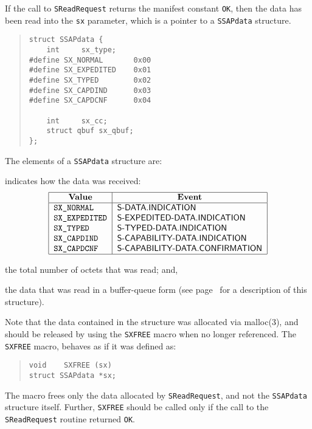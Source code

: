 If the call to \verb"SReadRequest" returns the manifest constant \verb"OK",
then the data has been read into the \verb"sx" parameter,
which is a pointer to a \verb"SSAPdata" structure.
\begin{quote}\small\begin{verbatim}
struct SSAPdata {
    int     sx_type;
#define SX_NORMAL       0x00
#define SX_EXPEDITED    0x01
#define SX_TYPED        0x02
#define SX_CAPDIND      0x03
#define SX_CAPDCNF      0x04

    int     sx_cc;
    struct qbuf sx_qbuf;
};
\end{verbatim}\end{quote}
The elements of a \verb"SSAPdata" structure are:
\begin{describe}
\item[\verb"sx\_type":] indicates how the data was received:
\[\begin{tabular}{|l|l|}
\hline
    \multicolumn{1}{|c|}{\bf Value}&
		\multicolumn{1}{c|}{\bf Event}\\
\hline
    \tt SX\_NORMAL&	\sf S-DATA.INDICATION\\
    \tt SX\_EXPEDITED&	\sf S-EXPEDITED-DATA.INDICATION\\
    \tt SX\_TYPED&	\sf S-TYPED-DATA.INDICATION\\
    \tt SX\_CAPDIND&	\sf S-CAPABILITY-DATA.INDICATION\\
    \tt SX\_CAPDCNF&	\sf S-CAPABILITY-DATA.CONFIRMATION\\
\hline
\end{tabular}\]

\item[\verb"sx\_cc":] the total number of octets that was read;
and,

\item[\verb"sx\_qbuf":] the data that was read in a buffer-queue form
(see page~\pageref{tsap:qbuf} for a description of this structure).
\end{describe}
Note that the data contained in the structure was allocated via \man malloc(3),
and should be released by using the \verb"SXFREE" macro when no longer
referenced.
The \verb"SXFREE" macro,
behaves as if it was defined as:\label{SXFREE}
\begin{quote}\small\begin{verbatim}
void    SXFREE (sx)
struct SSAPdata *sx;
\end{verbatim}\end{quote}
The macro frees only the data allocated by \verb"SReadRequest",
and not the \verb"SSAPdata" structure itself.
Further,
\verb"SXFREE" should be called only if the call to the \verb"SReadRequest"
routine returned \verb"OK".

